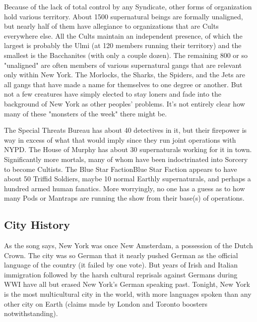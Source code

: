 Because of the lack of total control by any Syndicate, other forms of organization hold various territory. About 1500 supernatural beings are formally unaligned, but nearly half of them have allegiance to organizations that are Cults everywhere else. All the Cults maintain an independent presence, of which the largest is probably the Ulmi (at 120 members running their territory) and the smallest is the Bacchanites (with only a couple dozen). The remaining 800 or so "unaligned" are often members of various supernatural gangs that are relevant only within New York. The Morlocks, the Sharks, the Spiders, and the Jets are all gangs that have made a name for themselves to one degree or another. But not a few creatures have simply elected to stay loners and fade into the background of New York as other peoples' problems. It's not entirely clear how many of these "monsters of the week" there might be.

The Special Threats Bureau has about 40 detectives in it, but their firepower is way in excess of what that would imply since they run joint operations with NYPD. The House of Murphy has about 30 supernaturals working for it in town. Significantly more mortals, many of whom have been indoctrinated into Sorcery to become Cultists. The Blue Star Faction{Blue Star Faction} appears to have about 50 Triffid Soldiers, maybe 10 normal Earthly supernaturals, and perhaps a hundred armed human fanatics. More worryingly, no one has a guess as to how many Pods or Mantraps are running the show from their base(s) of operations.

\subsection{City History}

\hspace{\parindent} As the song says, New York was once New Amsterdam, a possession of the Dutch Crown. The city was so German that it nearly pushed German as the official language of the country (it failed by one vote). But years of Irish and Italian immigration followed by the harsh cultural reprisals against Germans during WWI have all but erased New York's German speaking past. Tonight, New York is the most multicultural city in the world, with more languages spoken than any other city on Earth (claims made by London and Toronto boosters notwithstanding).

